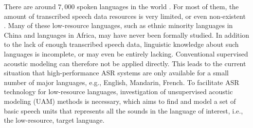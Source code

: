 \documentclass[transmag]{IEEEtran}
\begin{document}
There are around $7,000$ spoken languages in the world \cite{austin2011cambridge}.  For most of them, the amount of transcribed speech data resources is very limited, or even non-existent \cite{speech2020scharenborg}. Many of these low-resource languages, such as ethnic minority languages in China and languages in Africa, may have never been formally studied. In addition to the lack of enough transcribed speech data, linguistic knowledge about such languages is incomplete, or may even be entirely lacking. Conventional supervised acoustic modeling \cite{hinton2012deep,dahl2011context} can therefore not be applied directly. This leads to the current situation that high-performance ASR systems are only available for a small number of major languages, e.g., English, Mandarin, French. To facilitate ASR technology for low-resource languages, investigation of unsupervised acoustic modeling (UAM) methods is necessary, which aims to find and model a set of basic speech units that represents all the sounds in the language of interest, i.e., the low-resource, target language.
\end{document}
